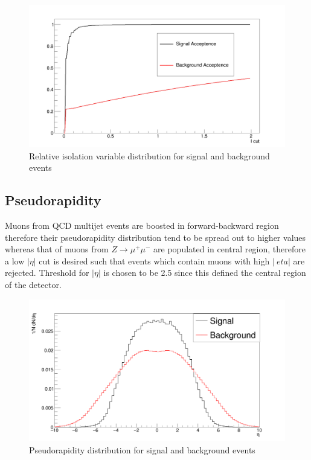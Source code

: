 \documentclass{article}		%
\begin{document}
\begin{figure}[h]
	\begin{center}
		\includegraphics[scale=0.2]{Iacc.png} 
		\caption{Relative isolation variable distribution for signal and background events} 		
	\end{center}
	\centering	
\end{figure}
		

\newpage			
\subsection{Pseudorapidity}  

Muons from QCD multijet events are boosted in forward-backward region therefore their pseudorapidity distribution tend to be spread out to higher values whereas that of muons from $Z \to \mu^+ \mu^-$ are populated in central region, therefore a low $|\eta|$ cut is desired such that events which contain muons with high $|\	eta| $ are rejected. Threshold for $|\eta|$ is chosen to be 2.5 since this defined the central region of the detector.    

\begin{figure}[h]
	\begin{center}
		\includegraphics[scale=0.2]{etasvsbkg.png} 
		\caption{Pseudorapidity distribution for signal and background events}		
	\end{center}
	\centering	
\end{figure}						    
\end{document}
